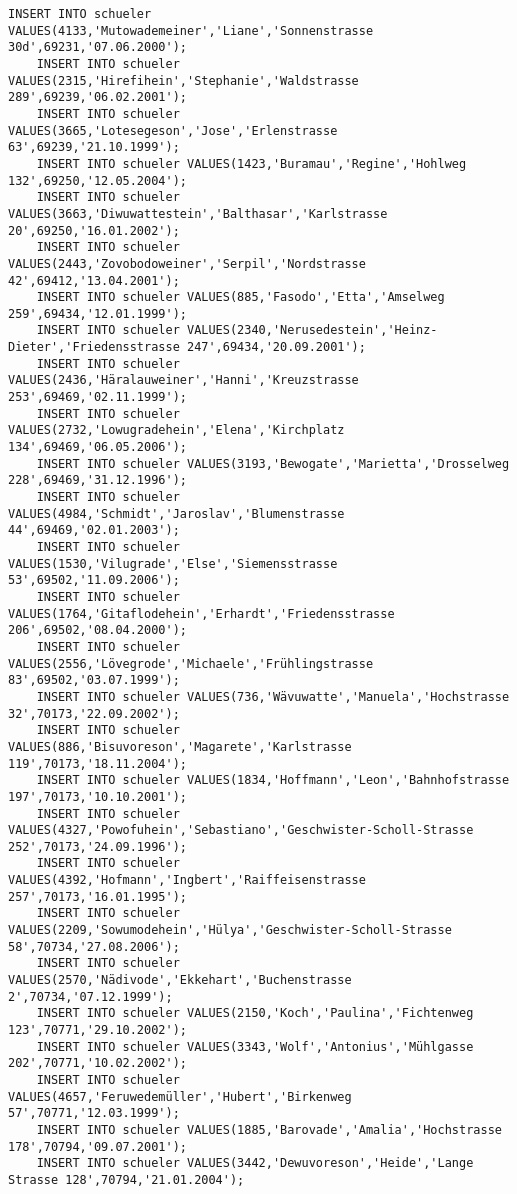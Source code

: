 \begin{lstlisting}[breaklines=True, numbers=none, basicstyle=\tiny, keepspaces=false]
	INSERT INTO schueler VALUES(4133,'Mutowademeiner','Liane','Sonnenstrasse 30d',69231,'07.06.2000');
	INSERT INTO schueler VALUES(2315,'Hirefihein','Stephanie','Waldstrasse 289',69239,'06.02.2001');
	INSERT INTO schueler VALUES(3665,'Lotesegeson','Jose','Erlenstrasse 63',69239,'21.10.1999');
	INSERT INTO schueler VALUES(1423,'Buramau','Regine','Hohlweg 132',69250,'12.05.2004');
	INSERT INTO schueler VALUES(3663,'Diwuwattestein','Balthasar','Karlstrasse 20',69250,'16.01.2002');
	INSERT INTO schueler VALUES(2443,'Zovobodoweiner','Serpil','Nordstrasse 42',69412,'13.04.2001');
	INSERT INTO schueler VALUES(885,'Fasodo','Etta','Amselweg 259',69434,'12.01.1999');
	INSERT INTO schueler VALUES(2340,'Nerusedestein','Heinz-Dieter','Friedensstrasse 247',69434,'20.09.2001');
	INSERT INTO schueler VALUES(2436,'Häralauweiner','Hanni','Kreuzstrasse 253',69469,'02.11.1999');
	INSERT INTO schueler VALUES(2732,'Lowugradehein','Elena','Kirchplatz 134',69469,'06.05.2006');
	INSERT INTO schueler VALUES(3193,'Bewogate','Marietta','Drosselweg 228',69469,'31.12.1996');
	INSERT INTO schueler VALUES(4984,'Schmidt','Jaroslav','Blumenstrasse 44',69469,'02.01.2003');
	INSERT INTO schueler VALUES(1530,'Vilugrade','Else','Siemensstrasse 53',69502,'11.09.2006');
	INSERT INTO schueler VALUES(1764,'Gitaflodehein','Erhardt','Friedensstrasse 206',69502,'08.04.2000');
	INSERT INTO schueler VALUES(2556,'Lövegrode','Michaele','Frühlingstrasse 83',69502,'03.07.1999');
	INSERT INTO schueler VALUES(736,'Wävuwatte','Manuela','Hochstrasse 32',70173,'22.09.2002');
	INSERT INTO schueler VALUES(886,'Bisuvoreson','Magarete','Karlstrasse 119',70173,'18.11.2004');
	INSERT INTO schueler VALUES(1834,'Hoffmann','Leon','Bahnhofstrasse 197',70173,'10.10.2001');
	INSERT INTO schueler VALUES(4327,'Powofuhein','Sebastiano','Geschwister-Scholl-Strasse 252',70173,'24.09.1996');
	INSERT INTO schueler VALUES(4392,'Hofmann','Ingbert','Raiffeisenstrasse 257',70173,'16.01.1995');
	INSERT INTO schueler VALUES(2209,'Sowumodehein','Hülya','Geschwister-Scholl-Strasse 58',70734,'27.08.2006');
	INSERT INTO schueler VALUES(2570,'Nädivode','Ekkehart','Buchenstrasse 2',70734,'07.12.1999');
	INSERT INTO schueler VALUES(2150,'Koch','Paulina','Fichtenweg 123',70771,'29.10.2002');
	INSERT INTO schueler VALUES(3343,'Wolf','Antonius','Mühlgasse 202',70771,'10.02.2002');
	INSERT INTO schueler VALUES(4657,'Feruwedemüller','Hubert','Birkenweg 57',70771,'12.03.1999');
	INSERT INTO schueler VALUES(1885,'Barovade','Amalia','Hochstrasse 178',70794,'09.07.2001');
	INSERT INTO schueler VALUES(3442,'Dewuvoreson','Heide','Lange Strasse 128',70794,'21.01.2004');

\end{lstlisting}
